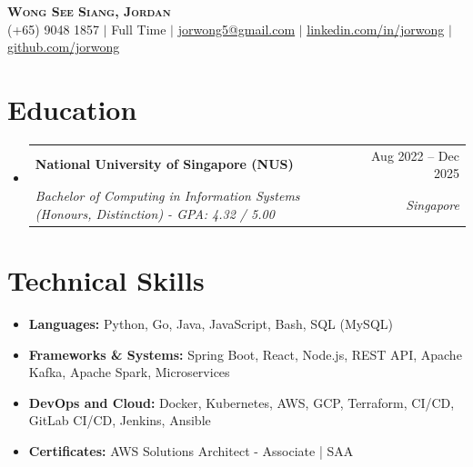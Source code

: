 \documentclass[letter-paper,11pt]{article}
\makeatletter
\newcommand{\resumeSubheading}[4]{
  \vspace{-2pt}\item
    \begin{tabular*}{0.97\textwidth}[t]{l@{\extracolsep{\fill}}r}
      \textbf{#1} & #2 \\
      \textit{#3} & \textit{\small #4} \\
    \end{tabular*}\vspace{-8pt}
}
\newcommand{\resumeProjectHeading}[3]{
    \item
    \begin{tabular*}{0.97\textwidth}{l@{\extracolsep{\fill}}r}
      \textbf{#1} $|$ \textit{#2} & #3 \\
    \end{tabular*}\vspace{-8pt}
}
\newcommand{\resumeSubHeadingListStart}{\begin{itemize}[leftmargin=0.15in, label={}]}
\newcommand{\resumeSubHeadingListEnd}{\end{itemize}}
\newenvironment{compactitemize}{
    \begin{itemize}[leftmargin=0.15in, label={}, itemsep=1pt, parsep=1pt, topsep=1pt, partopsep=1pt]
}{
    \end{itemize}
}
\makeatother
\begin{document}
\begin{center}
    \textbf{\Huge \scshape Wong See Siang, Jordan} \\ \vspace{0pt}
    \small (+65) 9048 1857 $|$ Full Time $|$ \href{mailto:jorwong5@gmail.com}{\underline{jorwong5@gmail.com}} $|$
    \href{https://linkedin.com/in/jorwong}{\underline{linkedin.com/in/jorwong}} $|$
    \href{https://github.com/jorwong}{\underline{github.com/jorwong}} \vspace{0pt} 
\end{center}

\section{Education}
  \resumeSubHeadingListStart
    \resumeSubheading
      {National University of Singapore (NUS)}{Aug 2022 -- Dec 2025}
      {Bachelor of Computing in Information Systems (Honours, Distinction) - GPA: 4.32 / 5.00}{Singapore}
  \resumeSubHeadingListEnd


\section{Technical Skills}
\begin{compactitemize}
    \small
    \item \textbf{Languages:}
        Python,
        Go,
        Java,
        JavaScript,
        Bash,
        SQL (MySQL)
    \item \textbf{Frameworks \& Systems:}
        Spring Boot,
        React,
        Node.js,
        REST API,
        Apache Kafka,
        Apache Spark,
        Microservices
    \item \textbf{DevOps and Cloud:}
        Docker, Kubernetes, AWS, GCP, Terraform, CI/CD, GitLab CI/CD, Jenkins, Ansible
    \item \textbf{Certificates:}
        AWS Solutions Architect - Associate | SAA
       
        
\end{compactitemize}
\end{document}
